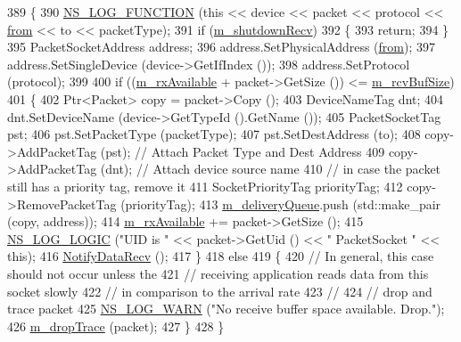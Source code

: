 \begin{DoxyCode}
389 \{
390   \hyperlink{log-macros-disabled_8h_a90b90d5bad1f39cb1b64923ea94c0761}{NS\_LOG\_FUNCTION} (\textcolor{keyword}{this} << device << packet << protocol << \hyperlink{lte__amc_8m_a1b4c81ff74eb1a626b5ade44c81004b3}{from} << to << packetType);
391   \textcolor{keywordflow}{if} (\hyperlink{classns3_1_1PacketSocket_af766986fa3298b3156972c0559fb8fa5}{m\_shutdownRecv})
392     \{
393       \textcolor{keywordflow}{return};
394     \}
395   PacketSocketAddress address;
396   address.SetPhysicalAddress (\hyperlink{lte__amc_8m_a1b4c81ff74eb1a626b5ade44c81004b3}{from});
397   address.SetSingleDevice (device->GetIfIndex ());
398   address.SetProtocol (protocol);
399 
400   \textcolor{keywordflow}{if} ((\hyperlink{classns3_1_1PacketSocket_a3afd17f0f1692c887648d0c2cb6d406c}{m\_rxAvailable} + packet->GetSize ()) <= \hyperlink{classns3_1_1PacketSocket_a77f51ae1c17685fee11e5e10d90bd2f4}{m\_rcvBufSize})
401     \{
402       Ptr<Packet> copy = packet->Copy ();
403       DeviceNameTag dnt;
404       dnt.SetDeviceName (device->GetTypeId ().GetName ());
405       PacketSocketTag pst;
406       pst.SetPacketType (packetType);
407       pst.SetDestAddress (to);
408       copy->AddPacketTag (pst); \textcolor{comment}{// Attach Packet Type and Dest Address}
409       copy->AddPacketTag (dnt); \textcolor{comment}{// Attach device source name}
410       \textcolor{comment}{// in case the packet still has a priority tag, remove it}
411       SocketPriorityTag priorityTag;
412       copy->RemovePacketTag (priorityTag);
413       \hyperlink{classns3_1_1PacketSocket_a436086ef3cbe575138ad46c14e58aa56}{m\_deliveryQueue}.push (std::make\_pair (copy, address));
414       \hyperlink{classns3_1_1PacketSocket_a3afd17f0f1692c887648d0c2cb6d406c}{m\_rxAvailable} += packet->GetSize ();
415       \hyperlink{group__logging_ga88acd260151caf2db9c0fc84997f45ce}{NS\_LOG\_LOGIC} (\textcolor{stringliteral}{"UID is "} << packet->GetUid () << \textcolor{stringliteral}{" PacketSocket "} << \textcolor{keyword}{this});
416       \hyperlink{classns3_1_1Socket_a91fa3046bbd0a7644381f1d2481bdfef}{NotifyDataRecv} ();
417     \}
418   \textcolor{keywordflow}{else}
419     \{
420       \textcolor{comment}{// In general, this case should not occur unless the}
421       \textcolor{comment}{// receiving application reads data from this socket slowly}
422       \textcolor{comment}{// in comparison to the arrival rate}
423       \textcolor{comment}{//}
424       \textcolor{comment}{// drop and trace packet}
425       \hyperlink{group__logging_gade7208b4009cdf0e25783cd26766f559}{NS\_LOG\_WARN} (\textcolor{stringliteral}{"No receive buffer space available.  Drop."});
426       \hyperlink{classns3_1_1PacketSocket_ae962e642085d93dadd3832a0355a10ad}{m\_dropTrace} (packet);
427     \}
428 \}
\end{DoxyCode}


